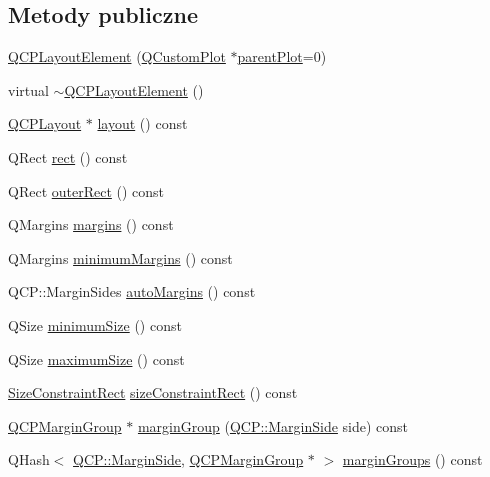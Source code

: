 \subsection*{Metody publiczne}
\begin{DoxyCompactItemize}
\item 
\hyperlink{class_q_c_p_layout_element_a8947f0ada17e672aaba3d424cbbb67e3}{Q\+C\+P\+Layout\+Element} (\hyperlink{class_q_custom_plot}{Q\+Custom\+Plot} $\ast$\hyperlink{class_q_c_p_layerable_ab7e0e94461566093d36ffc0f5312b109}{parent\+Plot}=0)
\item 
virtual \hyperlink{class_q_c_p_layout_element_a0dc52343920011b3e72d61fc94ed3400}{$\sim$\+Q\+C\+P\+Layout\+Element} ()
\item 
\hyperlink{class_q_c_p_layout}{Q\+C\+P\+Layout} $\ast$ \hyperlink{class_q_c_p_layout_element_a6235f5384db871fc6e3387a1bc558b0d}{layout} () const 
\item 
Q\+Rect \hyperlink{class_q_c_p_layout_element_affdfea003469aac3d0fac5f4e06171bc}{rect} () const 
\item 
Q\+Rect \hyperlink{class_q_c_p_layout_element_a60bbddee2d1230c2414bd776f44d17b8}{outer\+Rect} () const 
\item 
Q\+Margins \hyperlink{class_q_c_p_layout_element_a85ff977dfcced84eef32d9f819ec9543}{margins} () const 
\item 
Q\+Margins \hyperlink{class_q_c_p_layout_element_a60ec7f377c26726174d536bffb632002}{minimum\+Margins} () const 
\item 
Q\+C\+P\+::\+Margin\+Sides \hyperlink{class_q_c_p_layout_element_a2f499b1179b3126e22d0d7508124ccb3}{auto\+Margins} () const 
\item 
Q\+Size \hyperlink{class_q_c_p_layout_element_ae71f9230171d2d898e21dc461fc3df03}{minimum\+Size} () const 
\item 
Q\+Size \hyperlink{class_q_c_p_layout_element_a1fc85c79e15c2ab8051eccd455fccc4a}{maximum\+Size} () const 
\item 
\hyperlink{class_q_c_p_layout_element_a0afb3e5773529e4bd20e448f81be4d2a}{Size\+Constraint\+Rect} \hyperlink{class_q_c_p_layout_element_ad1785b700781fecf99f7b02e77b9ca03}{size\+Constraint\+Rect} () const 
\item 
\hyperlink{class_q_c_p_margin_group}{Q\+C\+P\+Margin\+Group} $\ast$ \hyperlink{class_q_c_p_layout_element_a22cb1bb62c452fd802e43ca2524660db}{margin\+Group} (\hyperlink{namespace_q_c_p_a7e487e3e2ccb62ab7771065bab7cae54}{Q\+C\+P\+::\+Margin\+Side} side) const 
\item 
Q\+Hash$<$ \hyperlink{namespace_q_c_p_a7e487e3e2ccb62ab7771065bab7cae54}{Q\+C\+P\+::\+Margin\+Side}, \hyperlink{class_q_c_p_margin_group}{Q\+C\+P\+Margin\+Group} $\ast$ $>$ \hyperlink{class_q_c_p_layout_element_ac43921c997570389c14a1671bc3ea499}{margin\+Groups} () const 

\end{DoxyCompactItemize}
